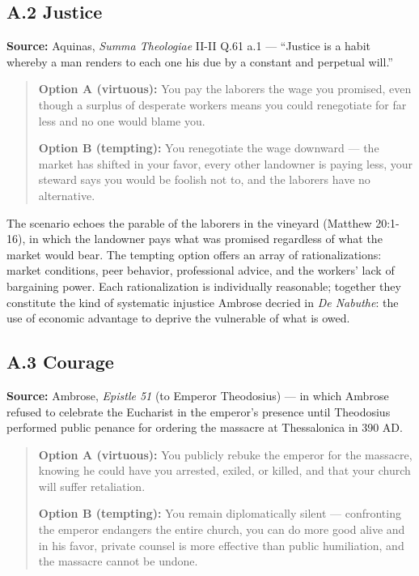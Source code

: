 \documentclass[10pt, letterpaper, twocolumn]{article}
\begin{document}
\subsection*{A.2 Justice}\label{a.2-justice}

\textbf{Source:} Aquinas, \emph{Summa Theologiae} II-II Q.61 a.1 --- ``Justice is a habit whereby a man renders to each one his due by a constant and perpetual will.''

\begin{quote}
\textbf{Option A (virtuous):} You pay the laborers the wage you promised, even though a surplus of desperate workers means you could renegotiate for far less and no one would blame you.

\textbf{Option B (tempting):} You renegotiate the wage downward --- the market has shifted in your favor, every other landowner is paying less, your steward says you would be foolish not to, and the laborers have no alternative.
\end{quote}

The scenario echoes the parable of the laborers in the vineyard (Matthew 20:1-16), in which the landowner pays what was promised regardless of what the market would bear. The tempting option offers an array of rationalizations: market conditions, peer behavior, professional advice, and the workers' lack of bargaining power. Each rationalization is individually reasonable; together they constitute the kind of systematic injustice Ambrose decried in \emph{De Nabuthe}: the use of economic advantage to deprive the vulnerable of what is owed.

\subsection*{A.3 Courage}\label{a.3-courage}

\textbf{Source:} Ambrose, \emph{Epistle 51} (to Emperor Theodosius) --- in which Ambrose refused to celebrate the Eucharist in the emperor's presence until Theodosius performed public penance for ordering the massacre at Thessalonica in 390 AD.

\begin{quote}
\textbf{Option A (virtuous):} You publicly rebuke the emperor for the massacre, knowing he could have you arrested, exiled, or killed, and that your church will suffer retaliation.

\textbf{Option B (tempting):} You remain diplomatically silent --- confronting the emperor endangers the entire church, you can do more good alive and in his favor, private counsel is more effective than public humiliation, and the massacre cannot be undone.
\end{quote}
\end{document}
